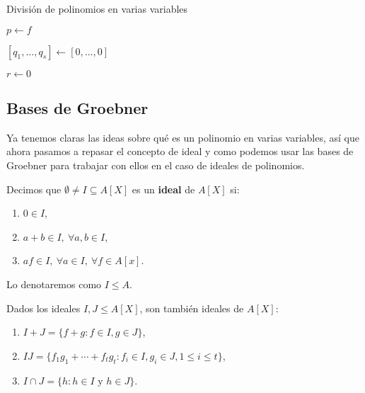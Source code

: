 \begin{algorithm}[hbt!]
    \caption{División de polinomios en varias variables}\label{a:division}
    $p\gets f$
    
    $\left[q_1,\dots, q_s\right] \gets \left[0,\dots, 0\right]$
    
    $r\gets 0$

\end{algorithm}

\subsection{Bases de Groebner}
Ya tenemos claras las ideas sobre qué es un polinomio en varias variables, así que ahora pasamos a repasar el concepto de ideal y como podemos usar las bases de Groebner para trabajar con ellos en el caso de ideales de polinomios.
\begin{definicion}
    Decimos que $\emptyset \neq I \subseteq A[X]$ es un \textbf{ideal} de $A[X]$ si:
    \begin{enumerate}
        \item $0\in I$,
        \item $a+b\in I,\ \forall a,b\in I$,
        \item $af\in I,\ \forall a\in I,\ \forall f\in A[x]$.
    \end{enumerate}

    Lo denotaremos como $I\le A$.
\end{definicion}

\begin{proposicion}
    Dados los ideales $I,J\le A[X]$, son también ideales de $A[X]$:
    \begin{enumerate}
        \item $I+J = \{f+g : f\in I, g\in J\}$,
        \item $IJ = \{f_1g_1 + \cdots + f_tg_t : f_i\in I, g_i\in J, 1\le i \le t\}$,
        \item $I\cap J = \{h: h\in I \text{ y } h\in J\}$.
    \end{enumerate}
\end{proposicion}

